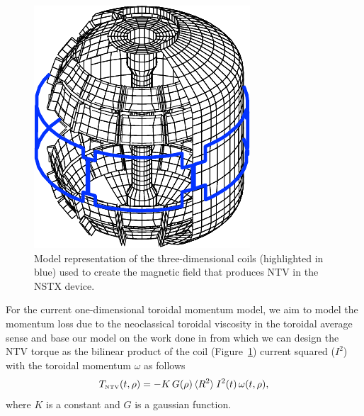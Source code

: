 \documentclass[12pt]{iopart}
\begin{document}
\begin{figure}
	\centering
   \includegraphics[width=0.6\linewidth]{imene_figs/pic_NTV}
\caption{Model representation of the three-dimensional coils (highlighted in blue) used to create the magnetic field that produces NTV in the NSTX device.}
  \label{pic_NTV}
\end{figure}
For the current one-dimensional toroidal momentum model, we aim to model the momentum loss due to the neoclassical toroidal viscosity in the toroidal average sense and base our model on the work done in \cite{Zhu06} from which we can design the NTV torque as the bilinear product of the coil (Figure~\ref{pic_NTV}) current squared ($ I^2$) with the toroidal momentum $\omega$ as follows
\begin{equation}
   T_\textrm{\tiny NTV}  (t, \rho) =  - K \, G(\rho) \,  \langle R^2 \rangle \:  I^2(t) \,\omega (t, \rho),
    \label{eqn:ntv}
\end{equation}
where $K$ is a constant and $G$ is a gaussian function.
\end{document}
